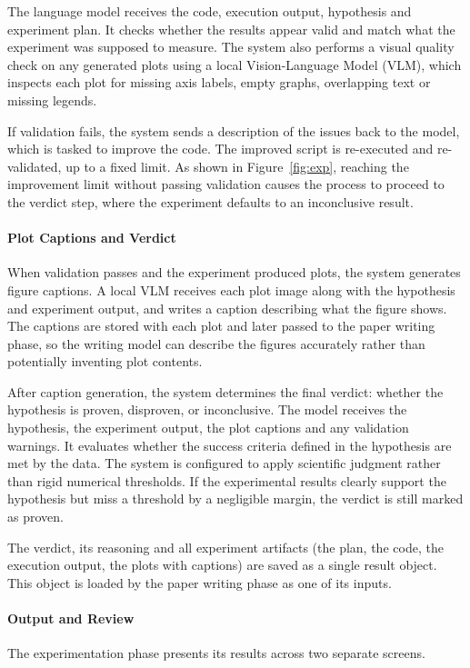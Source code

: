 The language model receives the code, execution output, hypothesis and experiment plan.
It checks whether the results appear valid and match what the experiment was supposed to measure.
The system also performs a visual quality check on any generated plots using a local Vision-Language Model (VLM), which inspects each plot for missing axis labels, empty graphs, overlapping text or missing legends.

If validation fails, the system sends a description of the issues back to the model, which is tasked to improve the code.
The improved script is re-executed and re-validated, up to a fixed limit.
As shown in Figure~\ref{fig:exp}, reaching the improvement limit without passing validation causes the process to proceed to the verdict step, where the experiment defaults to an inconclusive result.

\paragraph{Plot Captions and Verdict}
When validation passes and the experiment produced plots, the system generates figure captions.
A local VLM receives each plot image along with the hypothesis and experiment output, and writes a caption describing what the figure shows.
The captions are stored with each plot and later passed to the paper writing phase, so the writing model can describe the figures accurately rather than potentially inventing plot contents.

After caption generation, the system determines the final verdict: whether the hypothesis is proven, disproven, or inconclusive.
The model receives the hypothesis, the experiment output, the plot captions and any validation warnings.
It evaluates whether the success criteria defined in the hypothesis are met by the data.
The system is configured to apply scientific judgment rather than rigid numerical thresholds.
If the experimental results clearly support the hypothesis but miss a threshold by a negligible margin, the verdict is still marked as proven.

The verdict, its reasoning and all experiment artifacts (the plan, the code, the execution output, the plots with captions) are saved as a single result object.
This object is loaded by the paper writing phase as one of its inputs.

\paragraph{Output and Review}
The experimentation phase presents its results across two separate screens.

